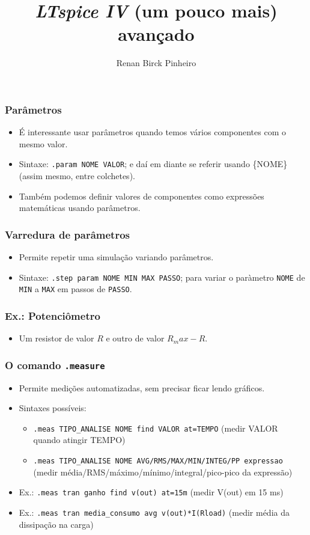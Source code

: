 \documentclass{beamer}
\title{\textit{LTspice IV} (um pouco mais) avançado}
\author{Renan Birck Pinheiro}
\institute{Universidade Federal de Santa Maria}
\begin{document}
\begin{frame}
\titlepage
\end{frame}

\begin{frame} %
\frametitle{Parâmetros}
\begin{itemize}
\item É interessante usar parâmetros quando temos vários componentes com o mesmo valor.
\item Sintaxe: \texttt{.param NOME VALOR}; e daí em diante se referir usando \{NOME\} (assim mesmo, entre colchetes).
\item Também podemos definir valores de componentes como expressões matemáticas usando parâmetros.
\end{itemize}
\end{frame} %

\begin{frame} %
\frametitle{Varredura de parâmetros}
\begin{itemize}
\item Permite repetir uma simulação variando parâmetros.
\item Sintaxe: \texttt{.step param NOME MIN MAX PASSO}; para variar o paràmetro \texttt{NOME} de \texttt{MIN} a \texttt{MAX} em passos de \texttt{PASSO}.
\end{itemize}
\end{frame} %

\begin{frame}
\frametitle{Ex.: Potenciômetro}
\begin{itemize}
\item Um resistor de valor $R$ e outro de valor $R_max - R$.
\end{itemize}
\end{frame}

\begin{frame}
\frametitle{O comando \texttt{.measure}}
\begin{itemize}
\item Permite medições automatizadas, sem precisar ficar lendo gráficos.
\item Sintaxes possíveis:
\begin{itemize}
\item \texttt{.meas TIPO\_ANALISE NOME find VALOR at=TEMPO} (medir VALOR quando atingir TEMPO)
\item \texttt{.meas TIPO\_ANALISE NOME AVG/RMS/MAX/MIN/INTEG/PP expressao} (medir média/RMS/máximo/mínimo/integral/pico-pico da expressão)
\end{itemize}
\item Ex.: \texttt{.meas tran ganho find v(out) at=15m} (medir V(out) em 15 ms)
\item Ex.: \texttt{.meas tran media\_consumo avg v(out)*I(Rload)} (medir média da dissipação na carga)
\end{itemize}
\end{frame}
\end{document}
